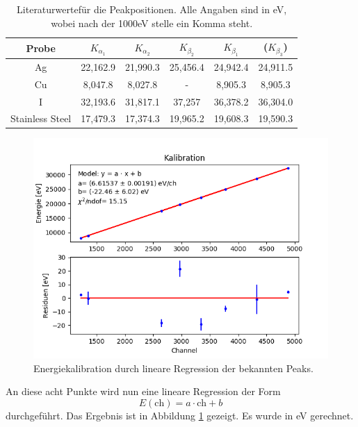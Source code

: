\documentclass[12pt,a4paper]{article}
\begin{document}
\begin{table}
\centering
\begin{tabular}{|c|c|c|c|c|c|}
\hline 
Probe & $K_{\alpha_1}$ & $K_{\alpha_2}$ & $K_{\beta_2}$ & $K_{\beta_{1}}$ & ($K_{\beta_{3}}$) \\ 
\hline 
Ag & 22,162.9 & 21,990.3 & 25,456.4 & 24,942.4 & 24,911.5\\ 
\hline 
Cu & 8,047.8 & 8,027.8 & - & 8,905.3 & 8,905.3\\ 
\hline
I & 32,193.6 & 31,817.1 & 37,257 & 36,378.2 & 36,304.0\\ 
\hline 
Stainless Steel & 17,479.3 & 17,374.3 & 19,965.2 & 19,608.3 & 19,590.3\\ 
\hline 
\end{tabular} 
\caption[test]{Literaturwerte\footnotemark für die Peakpositionen. Alle Angaben sind in eV, wobei nach der 1000eV stelle ein Komma steht.}
\label{tab:röntgen_lit}
\end{table}

\begin{figure}
\centering
\includegraphics[scale=0.8]{Bilder/roentgen/Kalibration/linReg.png}
\caption{Energiekalibration durch lineare Regression der bekannten Peaks.}
\label{fig:röntgen_linReg}
\end{figure}

An diese acht Punkte wird nun eine lineare Regression der Form
\begin{equation*}
E (\textrm{ch}) = a \cdot \textrm{ch} + b
\end{equation*}
durchgeführt. Das Ergebnis ist in Abbildung \ref{fig:röntgen_linReg} gezeigt. Es wurde in eV gerechnet.
\end{document}
